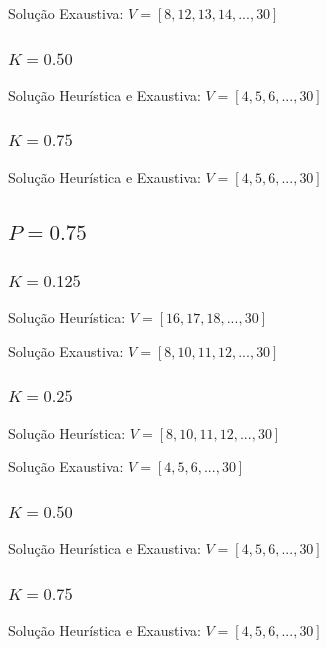 \documentclass{revdetua}
\begin{document}
Solução Exaustiva: $V = [8,12,13,14,...,30]$

\subsubsection{$K = 0.50$}
Solução Heurística e Exaustiva: $V = [4,5,6,...,30]$

\subsubsection{$K = 0.75$}
Solução Heurística e Exaustiva: $V = [4,5,6,...,30]$

\subsection{$P = 0.75$}
\subsubsection{$K = 0.125$}
Solução Heurística: $V = [16,17,18,...,30]$

Solução Exaustiva: $V = [8,10,11,12,...,30]$

\subsubsection{$K = 0.25$}
Solução Heurística: $V = [8,10,11,12,...,30]$

Solução Exaustiva: $V = [4,5,6,...,30]$

\subsubsection{$K = 0.50$}
Solução Heurística e Exaustiva: $V = [4,5,6,...,30]$

\subsubsection{$K = 0.75$}
Solução Heurística e Exaustiva: $V = [4,5,6,...,30]$
\end{document}
